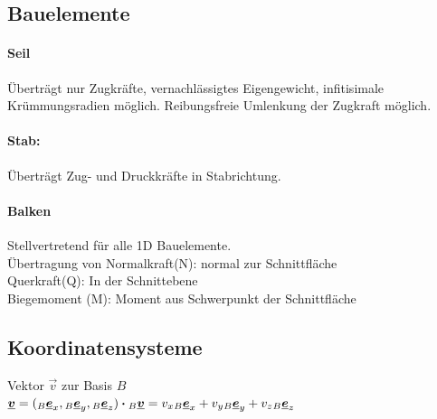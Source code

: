 \documentclass[fs, footer]{latex4ei}
\begin{document}
\begin{multicols}{4}
	\subsection{Bauelemente}
	
		\paragraph{Seil}
		Überträgt nur Zugkräfte, vernachlässigtes Eigengewicht, infitisimale Krümmungsradien möglich.
		Reibungsfreie Umlenkung der Zugkraft möglich.

		\paragraph{Stab:}
		Überträgt Zug- und Druckkräfte in Stabrichtung.
		
		\paragraph{Balken} Stellvertretend für alle 1D Bauelemente.\\
		Übertragung von Normalkraft(N): normal zur Schnittfläche\\
		Querkraft(Q): In der Schnittebene\\
		Biegemoment (M): Moment aus Schwerpunkt der Schnittfläche\\
		
		


	\subsection{Koordinatensysteme}
	Vektor $\vec v$ zur Basis $B$\\
	$\underline{\boldsymbol {v}} = (_B \underline{\boldsymbol {e}}_x, {_B} \underline{\boldsymbol {e}}_y, {_B} \underline{\boldsymbol {e}}_z) \boldsymbol \cdot {_B}\underline{\boldsymbol {v}} = v_x {_B} \underline{\boldsymbol {e}}_x +  v_y {_B} \underline{\boldsymbol {e}}_y + v_z {_B} \underline{\boldsymbol {e}}_z$\\
	

\end{multicols}
\end{document}
